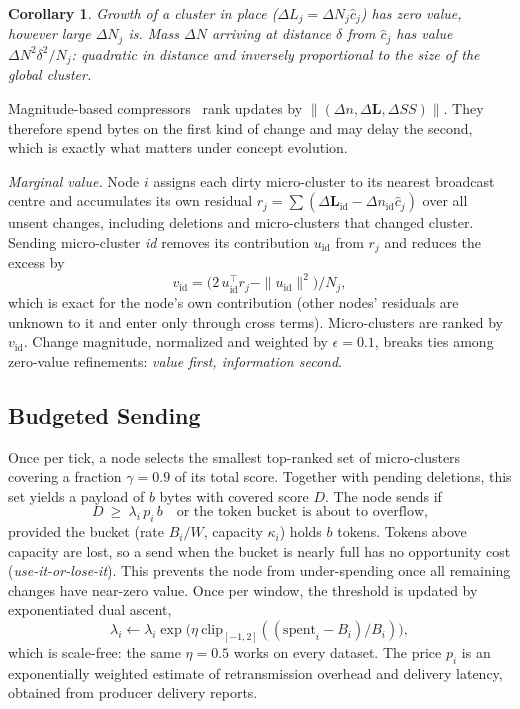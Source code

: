 \documentclass[journal]{IEEEtran}
\newtheorem{corollary}{Corollary}
\newcommand{\LS}{\mathbf{L}}
\begin{document}
\begin{corollary}\label{cor:inplace}
Growth of a cluster in place ($\Delta L_j=\Delta N_j\hat c_j$) has zero value, however large $\Delta N_j$ is. Mass $\Delta N$ arriving at distance $\delta$ from $\hat c_j$ has value $\Delta N^2\delta^2/N_j$: quadratic in distance and inversely proportional to the size of the global cluster.
\end{corollary}

Magnitude-based compressors~\cite{aji2017sparse,stich2018sparsified} rank updates by $\|(\Delta n,\Delta\LS,\Delta SS)\|$. They therefore spend bytes on the first kind of change and may delay the second, which is exactly what matters under concept evolution.

\textit{Marginal value.} Node $i$ assigns each dirty micro-cluster to its nearest broadcast centre and accumulates its own residual $r_j=\sum(\Delta\LS_{\mathrm{id}}-\Delta n_{\mathrm{id}}\hat c_j)$ over all unsent changes, including deletions and micro-clusters that changed cluster. Sending micro-cluster \textit{id} removes its contribution $u_{\mathrm{id}}$ from $r_j$ and reduces the excess by
\begin{equation}\label{eq:marginal}
v_{\mathrm{id}}=\big(2\,u_{\mathrm{id}}^{\!\top}r_j-\|u_{\mathrm{id}}\|^2\big)/N_j ,
\end{equation}
which is exact for the node's own contribution (other nodes' residuals are unknown to it and enter only through cross terms). Micro-clusters are ranked by $v_{\mathrm{id}}$. Change magnitude, normalized and weighted by $\epsilon=0.1$, breaks ties among zero-value refinements: \emph{value first, information second}.

\subsection{Budgeted Sending}\label{sec:policy}
Once per tick, a node selects the smallest top-ranked set of micro-clusters covering a fraction $\gamma=0.9$ of its total score. Together with pending deletions, this set yields a payload of $b$ bytes with covered score $D$. The node sends if
\begin{equation}\label{eq:trigger}
D\ \ge\ \lambda_i\,p_i\,b \quad\text{or the token bucket is about to overflow,}
\end{equation}
provided the bucket (rate $B_i/W$, capacity $\kappa_i$) holds $b$ tokens. Tokens above capacity are lost, so a send when the bucket is nearly full has no opportunity cost (\emph{use-it-or-lose-it}). This prevents the node from under-spending once all remaining changes have near-zero value. Once per window, the threshold is updated by exponentiated dual ascent,
\begin{equation}\label{eq:dual}
\lambda_i\leftarrow\lambda_i\exp\!\big(\eta\ \mathrm{clip}_{[-1,2]}((\text{spent}_i-B_i)/B_i)\big),
\end{equation}
which is scale-free: the same $\eta=0.5$ works on every dataset. The price $p_i$ is an exponentially weighted estimate of retransmission overhead and delivery latency, obtained from producer delivery reports.
\end{document}
